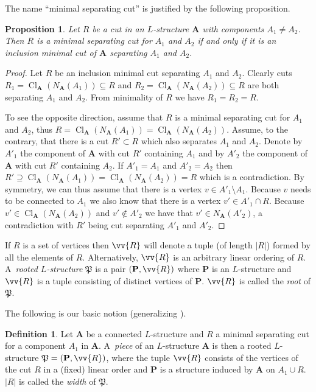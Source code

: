 \documentclass{elsarticle}
\def\Cl{\mathop{\mathrm{Cl}}\nolimits}
\def\ordclass#1{\vv{#1}}
\def\str#1{\mathbf {#1}}
\def\Piece{{\mathfrak P}}
\theoremstyle{plain}
\newtheorem{prop}[theorem]{Proposition}
\theoremstyle{definition}
\newtheorem{definition}[theorem]{Definition}
\theoremstyle{remark}
\begin{document}
The name ``minimal separating cut'' is justified by the following proposition.
\begin{prop}
\label{prop:sep}
Let $R$ be a cut in an $L$-structure $\str{A}$ with components $A_1\neq A_2$.
Then $R$ is a minimal separating cut for $A_1$ and $A_2$ if and only if it is an inclusion minimal cut of $\str{A}$ separating $A_1$ and $A_2$.
\end{prop}
\begin{proof}
Let $R$ be an inclusion minimal cut separating $A_1$ and $A_2$.
Clearly cuts $R_1=\Cl_\str{A}(N_\str{A}(A_1))\subseteq R$ and $R_2=\Cl_\str{A}(N_\str{A}(A_2))\subseteq R$
are both separating $A_1$ and $A_2$. From minimality of $R$ we have $R_1=R_2=R$.

To see the opposite direction, assume that $R$ is a minimal separating cut for $A_1$ and $A_2$, thus
$R=\Cl_\str{A}(N_\str{A}(A_1))=\Cl_\str{A}(N_\str{A}(A_2))$.  Assume, to the contrary, that  there
is a cut $R'\subset R$ which also separates $A_1$ and $A_2$. Denote by $A'_1$ the
component of $\str{A}$ with cut $R'$ containing $A_1$ and by $A'_2$
the component of $\str{A}$ with cut $R'$ containing $A_2$.  If $A'_1=A_1$
and $A'_2=A_2$ then $R'\supseteq
\Cl_\str{A}(N_\str{A}(A_1))=\Cl_\str{A}(N_\str{A}(A_2))=R$ which is a
contradiction.  By symmetry, we can thus assume that there is a vertex $v\in A'_1\setminus A_1$.
Because $v$ needs to be connected to $A_1$ we also know that there is a vertex $v'\in A'_1\cap R$.
 Because $v'\in \Cl_\str{A}(N_\str{A}(A_2))$ and $v'\notin A'_2$ we have that
$v'\in N_\str{A}(A'_2)$, a contradiction with $R'$ being cut separating $A'_1$ and $A'_2$.
\end{proof}


If $R$ is a set of vertices then $\ordclass{R}$ will denote a tuple (of
length $\vert R\vert $) formed by all the elements of $R$. Alternatively, $\ordclass{R}$
is an arbitrary linear ordering of $R$.
A~\emph{rooted $L$-structure} $\Piece$ is a pair $(\str{P},\ordclass{R})$
where $\str{P}$ is an $L$-structure and $\ordclass{R}$ is a
tuple consisting of distinct vertices of $\str{P}$. $\ordclass{R}$ is
called the \emph{root} of $\Piece$.


The following is our basic notion (generalizing \cite{Hubicka2013,Hubicka2009}).

\begin{definition}
\label{defn:piece}
Let $\str{A}$ be a connected $L$-structure and $R$ a minimal separating
cut for a component $A_1$ in $\str{A}$. A~\emph{piece} of an $L$-structure
$\str A$ is then a rooted $L$-structure $\Piece=(\str{P},\ordclass{R})$, where the
tuple $\ordclass{R}$ consists of the vertices of the cut $R$ in a (fixed)
linear order and $\str {P}$ is a structure induced by $\str{A}$ on $A_1\cup R$.
$\vert R\vert $ is called the \emph{width} of $\Piece$.
\end{definition}
\end{document}
